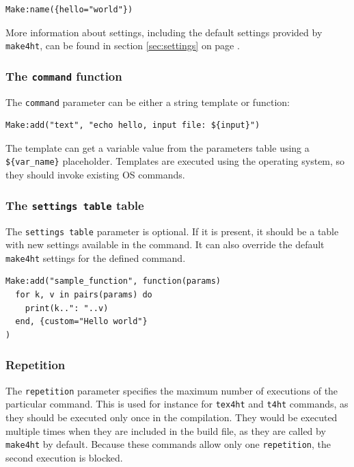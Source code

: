 \begin{verbatim}
Make:name({hello="world"})
\end{verbatim}

More information about settings, including the default settings provided
by \texttt{make4ht}, can be found in section \ref{sec:settings} on page
\pageref{sec:settings}.

\subsubsection{\texorpdfstring{The \texttt{command}
function}{The command function}}\label{the-command-function}

\label{sec:commandfunction}

The \texttt{command} parameter can be either a string template or
function:

\begin{verbatim}
Make:add("text", "echo hello, input file: ${input}")
\end{verbatim}

The template can get a variable value from the parameters table using a
\texttt{\$\{var\_name\}} placeholder. Templates are executed using the
operating system, so they should invoke existing OS commands.

\subsubsection{\texorpdfstring{The \texttt{settings\ table}
table}{The settings table table}}\label{the-settings-table-table}

The \texttt{settings\ table} parameter is optional. If it is present, it
should be a table with new settings available in the command. It can
also override the default \texttt{make4ht} settings for the defined
command.

\begin{verbatim}
Make:add("sample_function", function(params) 
  for k, v in pairs(params) do 
    print(k..": "..v) 
  end, {custom="Hello world"}
)
\end{verbatim}

\subsubsection{Repetition}\label{repetition}

The \texttt{repetition} parameter specifies the maximum number of
executions of the particular command. This is used for instance for
\texttt{tex4ht} and \texttt{t4ht} commands, as they should be executed
only once in the compilation. They would be executed multiple times when
they are included in the build file, as they are called by
\texttt{make4ht} by default. Because these commands allow only one
\texttt{repetition}, the second execution is blocked.

